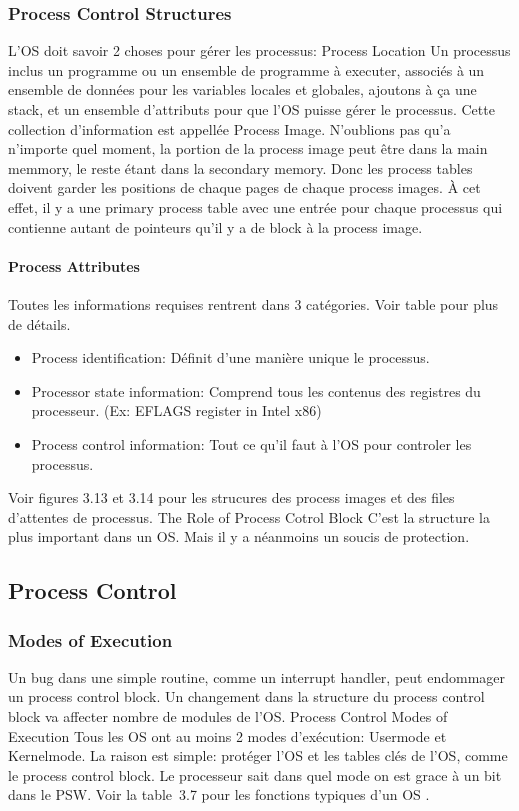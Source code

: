 \subsubsection{Process Control Structures}
L'OS doit savoir 2 choses pour gérer les processus:
Process Location
Un processus inclus un programme ou un ensemble de programme à executer, associés à un ensemble de données pour les variables locales et globales, ajoutons à ça une stack, et un ensemble d'attributs pour que l'OS puisse gérer le processus.
Cette collection d'information est appellée Process Image.
N'oublions pas qu'a n'importe quel moment, la portion de la process image peut être dans la main memmory, le reste étant dans la secondary memory.
Donc les process tables doivent garder les positions de chaque pages de chaque process images.
À cet effet, il y a une primary process table avec une entrée pour chaque processus qui contienne autant de pointeurs qu'il y a de block à la process image.

\paragraph{Process Attributes}
Toutes les informations requises rentrent dans 3 catégories.
Voir table \cite[p.~150]{stallings} pour plus de détails.
\begin{itemize}
  \item Process identification: Définit d'une manière unique le processus.
  \item Processor state information: Comprend tous les contenus des registres du processeur.
    (Ex: EFLAGS register in Intel x86)
  \item Process control information: Tout ce qu'il faut à l'OS pour controler les processus.
\end{itemize}
Voir figures 3.13 et 3.14 \cite[p.~153-154]{stallings} pour les strucures des process images et des files d'attentes de processus.
The Role of Process Cotrol Block
C'est la structure la plus important dans un OS.
Mais il y a néanmoins un soucis de protection.

\subsection{Process Control}
\subsubsection{Modes of Execution}
Un bug dans une simple routine, comme un interrupt handler, peut endommager un process control block.
Un changement dans la structure du process control block va affecter nombre de modules de l'OS.
Process Control Modes of Execution
Tous les OS ont au moins 2 modes d'exécution: Usermode et Kernelmode.
La raison est simple: protéger l'OS et les tables clés de l'OS, comme le process control block.
Le processeur sait dans quel mode on est grace à un bit dans le PSW.
Voir la table~3.7 pour les fonctions typiques d'un OS \cite[p.~135]{stallings}.

